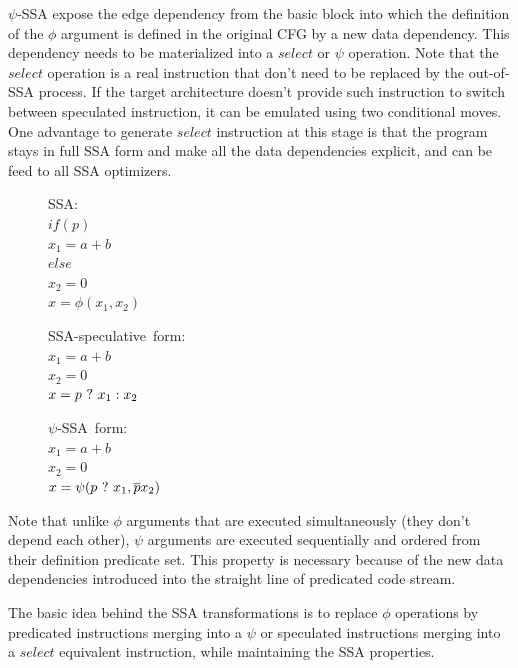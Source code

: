 $\psi$-SSA expose the edge dependency from the basic block into which the definition of the $\phi$ argument is defined in the original CFG by a new data dependency. This dependency needs to be materialized into a $select$ or $\psi$ operation. Note that the $select$ operation is a real instruction that don't need to be replaced by the out-of-SSA process. If the target architecture doesn't provide such instruction to switch between speculated instruction, it can be emulated using two conditional moves. One advantage to generate $select$ instruction at this stage is that the program stays in full SSA form and make all the data dependencies explicit, and can be feed to all SSA optimizers. 

\begin{figure}
\begin{minipage}[t]{3.5cm}
\mbox{SSA:} \\
$ if (p) $ \\
$   x_1 = a+b $ \\
$ else $ \\
$   x_2 = 0 $ \\
$ x = \phi (x_1, x_2) $ \\
\end{minipage}
\begin{minipage}[t]{3.5cm}
\mbox{SSA-speculative form:} \\
$x_1 = a + b $ \\
$x_2 = 0 $ \\
$x = p ~?~  x_1 : x_2$ \\
\end{minipage}
\begin{minipage}[t]{3.5cm}
\mbox{$\psi$-SSA form:} \\
$x_1 = a + b $ \\
$x_2 = 0 $\\
$x = \psi (p ~?~ x_1, \overline{p} x_2) $ \\
\end{minipage}
\end{figure}

Note that unlike $\phi$ arguments that are executed simultaneously (they don't depend each other), $\psi$ arguments are executed sequentially and ordered from their definition predicate set. This property is necessary because of the new data dependencies introduced into the straight line of predicated code stream.

The basic idea behind the SSA transformations is to replace $\phi$ operations by predicated instructions merging into a $\psi$ or speculated instructions merging into a $select$ equivalent instruction, while maintaining the SSA properties.

